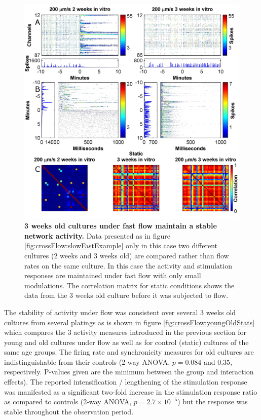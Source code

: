         \begin{figure}[!htb]
            \centering
            \includegraphics[width=15cm]{chapter5/figures/youngOldExample/youngOldRasterExample.jpg}
            \caption[Example for the effect of culture age on the network activity under flow]{\textbf{3 weeks old cultures under fast flow maintain a stable network activity.} Data presented as in figure \ref{fig:crossFlow:slowFastExample} only in this case two different cultures (2 weeks and 3 weeks old) are compared rather than flow rates on the same culture. In this case the activity and stimulation responses are maintained under fast flow with only small modulations. The correlation matrix for static conditions shows the data from the 3 weeks old culture before it was subjected to flow.}
            \label{fig:crossFlow:youngOldExampleRaster}
        \end{figure}

        The stability of activity under flow was consistent over several 3 weeks old cultures from several platings as is shown in figure \ref{fig:crossFlow:youngOldStats} which compares the 3 activity measures introduced in the previous section for young and old cultures under flow as well as for control (static) cultures of the same age groups. The firing rate and synchronicity measures for old cultures are indistinguishable from their controls (2-way ANOVA, \(p=0.084\) and \(0.35\), respectively. P-values given are the minimum between the group and interaction effects). The reported intensification / lengthening of the stimulation response was manifested as a significant two-fold increase in the stimulation response ratio as compared to controls (2-way ANOVA, \(p=2.7\times 10^{-5}\)) but the response was stable throughout the observation period.

